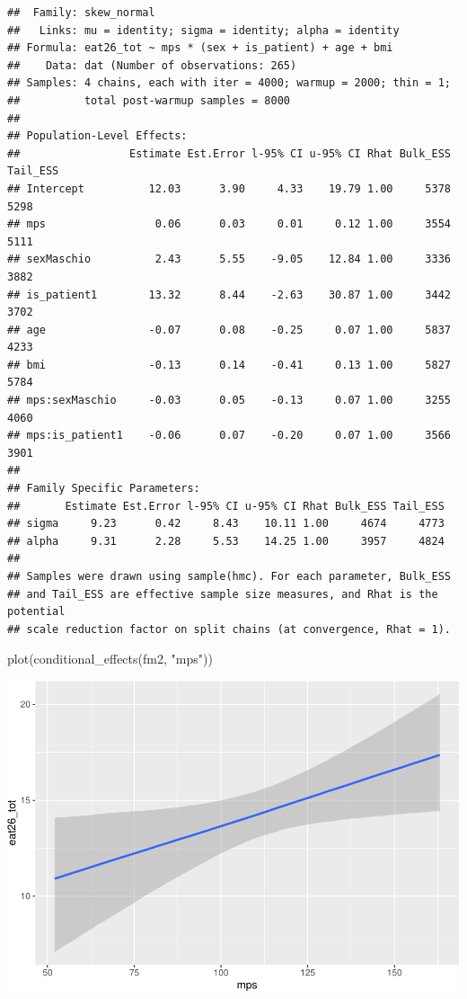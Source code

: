 \documentclass[
]{article}
\newenvironment{Shaded}{\begin{snugshade}}{\end{snugshade}}
\newcommand{\FunctionTok}[1]{\textcolor[rgb]{0.00,0.00,0.00}{#1}}
\newcommand{\NormalTok}[1]{#1}
\newcommand{\StringTok}[1]{\textcolor[rgb]{0.31,0.60,0.02}{#1}}
\begin{document}
\begin{verbatim}
##  Family: skew_normal 
##   Links: mu = identity; sigma = identity; alpha = identity 
## Formula: eat26_tot ~ mps * (sex + is_patient) + age + bmi 
##    Data: dat (Number of observations: 265) 
## Samples: 4 chains, each with iter = 4000; warmup = 2000; thin = 1;
##          total post-warmup samples = 8000
## 
## Population-Level Effects: 
##                 Estimate Est.Error l-95% CI u-95% CI Rhat Bulk_ESS Tail_ESS
## Intercept          12.03      3.90     4.33    19.79 1.00     5378     5298
## mps                 0.06      0.03     0.01     0.12 1.00     3554     5111
## sexMaschio          2.43      5.55    -9.05    12.84 1.00     3336     3882
## is_patient1        13.32      8.44    -2.63    30.87 1.00     3442     3702
## age                -0.07      0.08    -0.25     0.07 1.00     5837     4233
## bmi                -0.13      0.14    -0.41     0.13 1.00     5827     5784
## mps:sexMaschio     -0.03      0.05    -0.13     0.07 1.00     3255     4060
## mps:is_patient1    -0.06      0.07    -0.20     0.07 1.00     3566     3901
## 
## Family Specific Parameters: 
##       Estimate Est.Error l-95% CI u-95% CI Rhat Bulk_ESS Tail_ESS
## sigma     9.23      0.42     8.43    10.11 1.00     4674     4773
## alpha     9.31      2.28     5.53    14.25 1.00     3957     4824
## 
## Samples were drawn using sample(hmc). For each parameter, Bulk_ESS
## and Tail_ESS are effective sample size measures, and Rhat is the potential
## scale reduction factor on split chains (at convergence, Rhat = 1).
\end{verbatim}

\begin{Shaded}
\begin{Highlighting}[]
\FunctionTok{plot}\NormalTok{(}\FunctionTok{conditional\_effects}\NormalTok{(fm2, }\StringTok{"mps"}\NormalTok{))}
\end{Highlighting}
\end{Shaded}

\includegraphics{050_quest_groups_files/figure-latex/unnamed-chunk-2-17.pdf}
\end{document}
